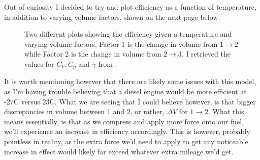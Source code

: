 \documentclass{article}
\begin{document}
\begin{itemize}
Out of curiosity I decided to try and plot efficiency as a function of temperature, in addition to varying volume factors, shown on the next page below:
\begin{figure}[ht!] \label{fig1}
\centering
{}
\caption{Two different plots showing the efficiency given a temperature and varying volume factors. \newline
Factor 1 is the change in volume from $1\xrightarrow{} 2$ while Factor 2 is the change in volume from $2 \xrightarrow{} 3$. \newline I retrieved the values for $C_V, C_p$ and $\gamma$ from \cite{sourc2}.}

\end{figure}
\newpage
It is worth mentioning however that there are likely some issues with this model, as I'm having trouble believing that a diesel engine would be more efficient at -27\degree C versus 23\degree C. What we are seeing that I could believe however, is that bigger discrepancies in volume between 1 and 2, or rather, $\Delta V$ for $1\xrightarrow{} 2$. What this means essentially, is that as we compress and apply more force onto our fuel, we'll experience an increase in efficiency accordingly. This is however, probably pointless in reality, as the extra force we'd need to apply to get any noticeable increase in effect would likely far exceed whatever extra mileage we'd get.
\end{itemize}
\clearpage
\end{document}
